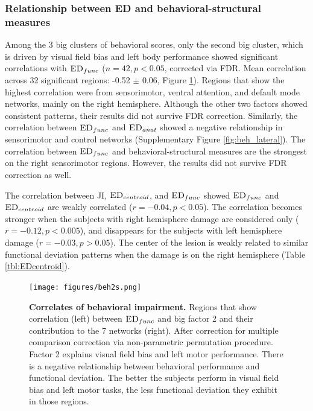 \documentclass[fleqn,10pt]{wlscirep}
\begin{document}
\subsubsection*{Relationship between ED and behavioral-structural measures}

Among the 3 big clusters of behavioral scores, only the second big cluster, which is driven by visual field bias and left body performance showed significant correlations with $\textsc{ED}_{{func}}$ ($ n = 42, p < 0.05$, corrected via FDR. Mean correlation across 32 significant regions: -0.52 $\pm$ 0.06, Figure \ref{fig:beh_wb}). Regions that show the highest correlation were from sensorimotor, ventral attention, and default mode networks, mainly on the right hemisphere. Although the other two factors showed consistent patterns, their results did not survive FDR correction. Similarly, the correlation between $\textsc{ED}_{{func}}$ and $\textsc{ED}_{{anat}}$ showed a negative relationship in sensorimotor and control networks (Supplementary Figure \ref{fig:beh_lateral}). The correlation between $\textsc{ED}_{{func}}$ and behavioral-structural measures are the strongest on the right sensorimotor regions. However, the results did not survive FDR correction as well.

The correlation between JI, $\textsc{ED}_{{centroid}}$, and $\textsc{ED}_{{func}}$ showed $\textsc{ED}_{{func}}$ and $\textsc{ED}_{{centroid}}$ are weakly correlated ($ r = -0.04, p < 0.05$). The correlation becomes stronger when the subjects with right hemisphere damage are considered only ($ r = -0.12, p < 0.005$), and disappears for the subjects with left hemisphere damage ($ r = -0.03, p > 0.05$). The center of the lesion is weakly related to similar functional deviation patterns when the damage is on the right hemisphere (Table \ref{tbl:EDcentroid}). 



\begin{figure}[b]
\centering
\texttt{[image: figures/beh2s.png]}
\caption{\label{fig:beh_wb} \textbf{Correlates of behavioral impairment.} Regions that show correlation (left) between $\textsc{ED}_{{func}}$  and big factor 2 and their contribution to the 7 networks (right). After correction for multiple comparison correction via non-parametric permutation procedure. Factor 2 explains visual field bias and left motor performance. There is a negative relationship between behavioral performance and functional deviation. The better the subjects perform in visual field bias and left motor tasks, the less functional deviation they exhibit in those regions. } 
\end{figure}
\end{document}
